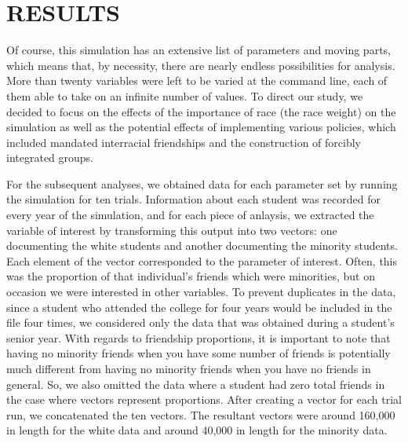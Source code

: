 
\section{RESULTS}
\label{sec:results}

Of course, this simulation has an extensive list of parameters and moving parts, which means that, by necessity, 
there are nearly endless possibilities for analysis. More than twenty variables were left to be varied at the command line, 
each of them able to take on an infinite number of values. To direct our study, we decided to focus on the effects of the 
importance of race (the race weight) on the simulation as well as the potential effects of implementing various policies, 
which included mandated interracial friendships and the construction of forcibly integrated groups.

For the subsequent analyses, we obtained data for each parameter set by running the simulation for ten trials. Information about each student was recorded for every year of the 
simulation, and for each piece of anlaysis, we extracted the variable of interest by transforming this output into two vectors: one documenting the white students and another documenting the minority students. Each element of the vector corresponded to the parameter of interest. Often, this was the proportion of that individual's friends which were 
minorities, but on occasion we were interested in other variables. To prevent duplicates in the data, since a student who attended the college for four years would be included in the file four 
times, we considered only the data that was obtained during a student's senior year. With regards to friendship proportions, it is important to note 
that having no minority friends when you have some number of friends is potentially much different from having no 
minority friends when you have no friends in general. So, we also omitted the data where a student had zero total friends in the case where vectors represent proportions.
After creating a vector for each trial run, we concatenated the ten vectors. The resultant vectors were around 160,000 in 
length for the white data and around 40,000 in length for the minority data.

